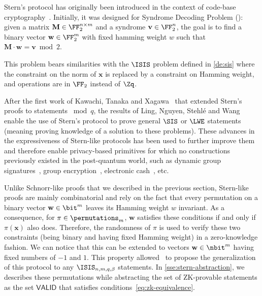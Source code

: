 
Stern's protocol has originally been introduced in the context of code-base cryptography~\cite{Ste96}.
Initially, it was designed for Syndrome Decoding Problem (\SDP): given a matrix $\mathbf{M} \in \FF_2^{n \times m}$ and a syndrome $\mathbf{v} \in \FF_2^n$, the goal is to find a binary vector $\mathbf{w} \in \FF_2^m$ with fixed hamming weight $w$ such that $\mathbf{M} \cdot \mathbf{w} = \mathbf{v} \bmod 2$.

This problem bears similarities with the $\ISIS$ problem defined in \cref{de:sis} where the constraint on the norm of $\mathbf{x}$ is replaced by a constraint on Hamming weight, and operations are in $\FF_2$ instead of $\Zq$.

After the first work of Kawachi, Tanaka and Xagawa~\cite{KTX08} that extended Stern's proofs to statements $\bmod q$, the results of Ling, Nguyen, Stehlé and Wang~\cite{LNSW13} enable the use of Stern's protocol to prove general $\SIS$ or $\LWE$ statements (meaning proving knowledge of a solution to these problems).
These advances in the expressiveness of Stern-like protocols has been used to further improve them and therefore enable privacy-based primitives for which no constructions previously existed in the post-quantum world, such as dynamic group signatures~\cite{LLM+16}, group encryption~\cite{LLM+16a}, electronic cash~\cite{LLNW17}, etc.

Unlike Schnorr-like proofs that we described in the previous section, Stern-like proofs are mainly combinatorial and rely on the fact that every permutation on a binary vector $\mathbf{w} \in \bit^m_{}$ leaves its Hamming weight $w$ invariant. As a consequence, for $\pi \in \permutations_m$, $\mathbf{w}$ satisfies these conditions if and only if $\pi(\mathbf{x})$ also does.
Therefore, the randomness of $\pi$ is used to verify these two constraints (being binary and having fixed Hamming weight) in a zero-knowledge fashion.
We can notice that this can be extended to vectors $\mathbf{w} \in \nbit^m$ having fixed numbers of $-1$ and $1$.
This property allowed~\cite{LNSW13} to propose the generalization of this protocol to any $\ISIS_{n,m,q,\beta}$ statements.
In \cref{sse:stern-abstraction}, we describes these permutations while abstracting the set of ZK-provable statements as the set $\mathsf{VALID}$ that satisfies conditions~\eqref{eq:zk-equivalence}.

